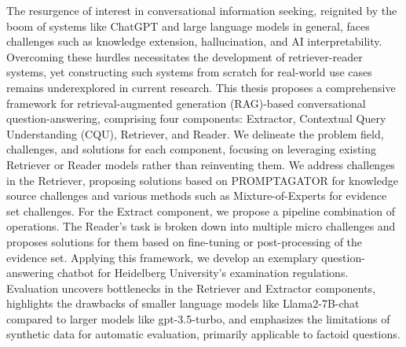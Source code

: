 The resurgence of interest in conversational information seeking, reignited by the boom of systems like ChatGPT and large language models in general, faces challenges such as knowledge extension, hallucination, and AI interpretability. Overcoming these hurdles necessitates the development of retriever-reader systems, yet constructing such systems from scratch for real-world use cases remains underexplored in current research. This thesis proposes a comprehensive framework for retrieval-augmented generation (RAG)-based conversational question-answering, comprising four components: Extractor, Contextual Query Understanding (CQU), Retriever, and Reader. We delineate the problem field, challenges, and solutions for each component, focusing on leveraging existing Retriever or Reader models rather than reinventing them. We address challenges in the Retriever, proposing solutions based on PROMPTAGATOR for knowledge source challenges and various methods such as Mixture-of-Experts for evidence set challenges. For the Extract component, we propose a pipeline combination of operations. The Reader's task is broken down into multiple micro challenges and proposes solutions for them based on fine-tuning or post-processing of the evidence set. Applying this framework, we develop an exemplary question-answering chatbot for Heidelberg University's examination regulations. Evaluation uncovers bottlenecks in the Retriever and Extractor components, highlights the drawbacks of smaller language models like Llama2-7B-chat compared to larger models like gpt-3.5-turbo, and emphasizes the limitations of synthetic data for automatic evaluation, primarily applicable to factoid questions. 
